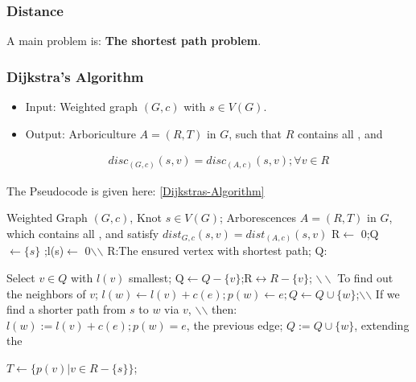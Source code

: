 \documentclass[Total.tex]{subfiles}
\begin{document}
		\subsubsection{Distance}
		
		
		
		A main problem is: \textbf{The shortest path problem}. 
		
		
		
		\subsubsection{Dijkstra's Algorithm}
		
		\begin{Def}
			\begin{itemize}
				\item 	Input: Weighted graph $(G,c)$ with $s\in V(G)$.  
				
				\item  Output: Arboriculture $A=(R,T)$ in $G$, such that $R$ contains all , and 
				
				\begin{gather*}
					disc_{(G,c)}(s,v)=disc_{(A,c)}(s,v);\forall v\in R
				\end{gather*}
			\end{itemize}
			
			The Pseudocode is given here: \ref{Dijkstras-Algorithm}
		\end{Def}
		
		\begin{algorithm}
			\caption{Dijkstra's Algorithm}
			\label{Dijkstras-Algorithm}
			\begin{algorithmic}
				\REQUIRE Weighted Graph $(G,c)$, Knot $s\in V(G)$;
				\ENSURE Arborescences $A=(R,T)$ in $G$, which contains all , and satisfy $dist_{G,c}(s,v)=dist_{(A,c)}(s,v)$
				\STATE R$\leftarrow$ 0;Q$\leftarrow\{s\}$ ;l(s)$\leftarrow$ 0\qquad$\backslash$$\backslash$ R:The ensured vertex with shortest path; Q:
				
				\STATE Select $v\in Q$ with $l(v)$ smallest;
				\STATE Q$\leftarrow Q-\{v\}$;R$\leftrightarrow R-\{v\}$;
				\STATE $\backslash\backslash$ To find out the neighbors of $v$;
				\STATE $l(w)\leftarrow l(v)+c(e);p(w)\leftarrow e;Q\leftarrow Q\cup \{w\}$;\qquad$\backslash$$\backslash$ If we find a shorter path from $s$ to $w$ via $v$,
				\STATE $\backslash$$\backslash$ then:$l(w):=l(v)+c(e);p(w)=e$, the previous edge; $Q:=Q\cup \{w\}$, extending the  
				\ENDIF
				\ENDFOR
				\ENDWHILE 
				
				$T\leftarrow \{p(v)|v\in R-\{s\}\}$;
			\end{algorithmic}
		\end{algorithm}
		
\end{document}
